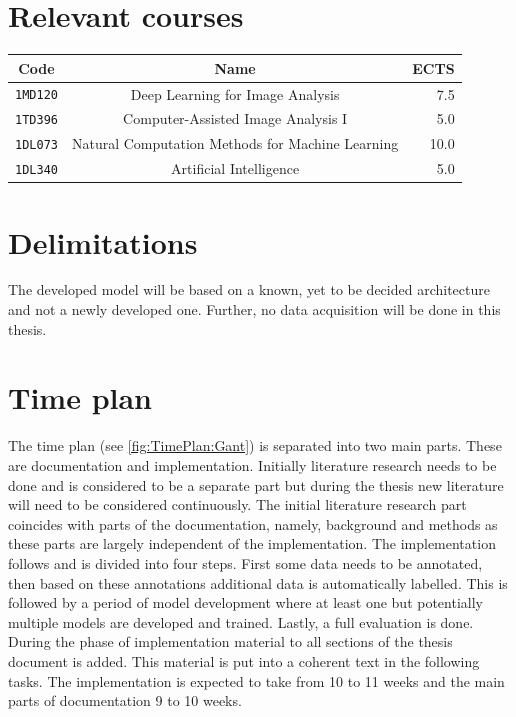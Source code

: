 \documentclass[a4paper,11pt]{article}
\begin{document}
\section{Relevant courses}

\begin{table}[H]
    \centering
    \begin{tabular}{|c|c|r|} 
        \hline
        Code & Name & ECTS \\
        \hline
        \texttt{1MD120} & Deep Learning for Image Analysis & 7.5 \\
        \texttt{1TD396} & Computer-Assisted Image Analysis I & 5.0\\
        \texttt{1DL073} & Natural Computation Methods for Machine Learning & 10.0 \\
        \texttt{1DL340} & Artificial Intelligence & 5.0\\
        \hline
    \end{tabular}
\end{table}

\section{Delimitations}


The developed model will be based on a known, yet to be decided architecture and not a newly developed one. Further, no data acquisition will be done in this thesis.

\section{Time plan}

The time plan (see \autoref{fig:TimePlan:Gant}) is separated into two main parts. These are documentation and implementation. Initially literature research needs to be done and is considered to be a separate part but during the thesis new literature will need to be considered continuously. The initial literature research part coincides with parts of the documentation, namely, background and methods as these parts are largely independent of the implementation. The implementation follows and is divided into four steps. First some data needs to be annotated, then based on these annotations additional data is automatically labelled. This is followed by a period of model development where at least one but potentially multiple models are developed and trained. Lastly, a full evaluation is done. During the phase of implementation material to all sections of the thesis document is added. This material is put into a coherent text in the following tasks. The implementation is expected to take from 10 to 11 weeks and the main parts of documentation 9 to 10 weeks.
\end{document}
